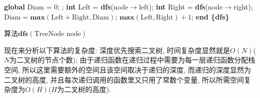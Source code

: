 \documentclass{article}
\begin{document}
\begin{homeworkProblem}
	\begin{algorithm}[H]
		\begin{algorithmic}[1]
		 
		\State \textbf{global} Diam = 0; 
		 
			\State {}; 
		\EndIf
		\State \textbf{int} Left = \textbf{dfs}(node$\rightarrow$left); 
		\State \textbf{int} Right = \textbf{dfs}(node$\rightarrow$right); 
		\State $\text{Diam} = \textbf{max}(\text{Left}+\text{Right}, \text{Diam})$; 
		\State \Return $\textbf{max}(\text{Left},\text{Right})+1$; 
		\State \textbf{end \{dfs\}}
		\end{algorithmic}
		\caption{算法$\textbf{dfs}(\text{TreeNode}\,\,\text{node})$}
		\label{alg:dfs}
	\end{algorithm}
	现在来分析以下算法的复杂度: 深度优先搜索二叉树, 时间复杂度显然就是$O(N)$($N$为二叉树的节点个数); 由于递归函数在递归过程中需要为每一层递归函数分配栈空间, 所以这里需要额外的空间且该空间取决于递归的深度, 而递归的深度显然为二叉树的高度, 并且每次递归调用的函数里又只用了常数个变量, 所以所需空间复杂度为$O(H)$($H$为二叉树的高度). 
\end{homeworkProblem}

\pagebreak
\end{document}

